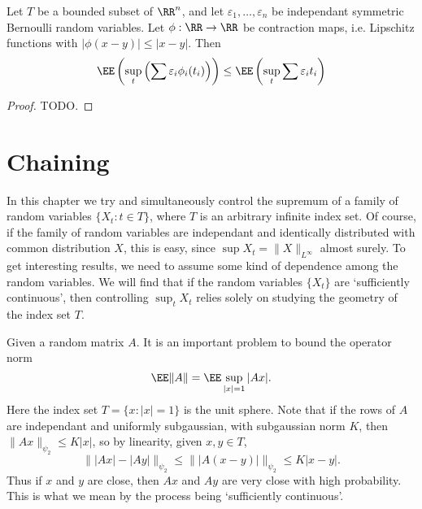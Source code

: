 \begin{theorem}
    Let $T$ be a bounded subset of $\RR^n$, and let $\varepsilon_1, \dots, \varepsilon_n$ be independant symmetric Bernoulli random variables. Let $\phi: \RR \to \RR$ be contraction maps, i.e. Lipschitz functions with $|\phi(x - y)| \leq |x - y|$. Then
    \[ \EE \left( \sup_t \left( \sum \varepsilon_i \phi_i(t_i) \right) \right) \leq \EE \left( \sup_t \sum \varepsilon_i t_i \right) \]
\end{theorem}
\begin{proof}
	TODO.
\end{proof}











\chapter{Chaining}

In this chapter we try and simultaneously control the supremum of a family of random variables $\{ X_t : t \in T \}$, where $T$ is an arbitrary infinite index set. Of course, if the family of random variables are independant and identically distributed with common distribution $X$, this is easy, since $\sup X_t = \| X \|_{L^\infty}$ almost surely. To get interesting results, we need to assume some kind of dependence among the random variables. We will find that if the random variables $\{ X_t \}$ are `sufficiently continuous', then controlling $\sup_t X_t$ relies solely on studying the geometry of the index set $T$.

\begin{example}
	Given a random matrix $A$. It is an important problem to bound the operator norm
	\[ \EE \| A \| = \EE \sup_{|x| = 1} |Ax|. \]
	Here the index set $T = \{ x : |x| = 1 \}$ is the unit sphere. Note that if the rows of $A$ are independant and uniformly subgaussian, with subgaussian norm $K$, then $\| Ax \|_{\psi_2} \leq K |x|$, so by linearity, given $x,y \in T$,
	\[ \| |Ax| - |Ay| \|_{\psi_2} \leq \| |A(x-y)| \|_{\psi_2} \leq K |x - y|. \]
	Thus if $x$ and $y$ are close, then $Ax$ and $Ay$ are very close with high probability. This is what we mean by the process being `sufficiently continuous'.
\end{example}

